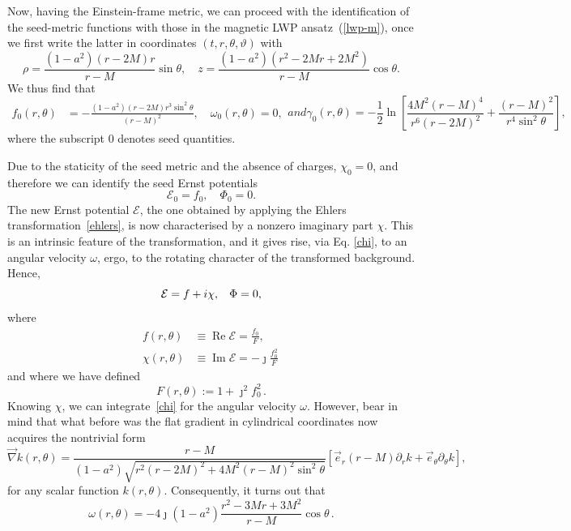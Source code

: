 \documentclass[aps,preprint,groupedaddress,nofootinbib,superscriptaddress,showkeys,showpacs,eqsecnum,amsmath,amssymb]{revtex4-1}
\newcommand{\ernst}{\mathcal{E}}
\renewcommand\Re{\operatorname{Re}}
\renewcommand\Im{\operatorname{Im}}
\begin{document}
Now, having the Einstein-frame metric, we can proceed with the identification of the seed-metric functions with those in the magnetic LWP ansatz~(\ref{lwp-m}), once we first write the latter in coordinates $(t,r,\theta,\vartheta)$ with 
\begin{equation}
    \rho = \frac{(1-a^2)(r-2M)r}{r-M}\sin\theta,\quad z=\frac{(1-a^2)(r^2-2M r + 2M^2)}{r-M}\cos\theta.
\end{equation}
We thus find that
\begin{subequations}\label{seedmetricLWP}
\begin{align}
f_0(r,\theta) &= -\frac{(1-a^2)(r-2M)r^3\sin^2\theta}{(r-M)^2}, \quad
\omega_0(r,\theta) = 0,
\end{align} 
and 
\begin{equation}
    \gamma_0(r,\theta)=-\frac{1}{2}\ln\left[ \frac{4M^2(r-M)^4}{r^6(r-2M)^2} + \frac{(r-M)^2}{r^4\sin^2\theta} \right],
\end{equation}
\end{subequations}
where the subscript $0$ denotes seed quantities. 


Due to the staticity of the seed metric and the absence of charges, $\chi_0=0$, and therefore we can identify 
the seed Ernst potentials
\begin{equation}
\ernst_0=f_0, \quad \Phi_0=0.
\end{equation}
The new Ernst potential $\ernst$, the one obtained by applying the Ehlers transformation~\eqref{ehlers}, is now characterised by a nonzero imaginary part $\chi$. This is an intrinsic feature of the transformation, and it gives rise, via Eq. \eqref{chi}, to an angular velocity $\omega$, ergo, to the rotating character of the transformed background. 
Hence, 
\begin{equation}
\ernst=f+i\chi, \hspace{0.3cm} \Phi=0,
\end{equation}
where 
\begin{subequations}
\begin{align}
f(r,\theta) &\equiv \Re \ernst= \frac{f_0}{F}, \\
\chi(r,\theta) &\equiv \Im\ernst= -\jmath \frac{f_0^2}{F} \, 
\end{align}
\end{subequations}
and where we have defined 
\begin{equation}
F(r,\theta) := 1 + \jmath^2 f_0^2 \,.
\end{equation}
Knowing $\chi$, we can integrate~\eqref{chi} for the angular velocity $\omega$. However, bear in mind that what before was the flat gradient in cylindrical coordinates now acquires the nontrivial form
\begin{equation}
    \vec{\nabla} k(r,\theta) = \frac{r-M}{(1-a^2)\sqrt{r^2(r-2M)^2 + 4M^2(r-M)^2\sin^2\theta}}\left[\vec{e}_r(r-M)\partial_r k + \vec{e}_\theta\partial_\theta k\right],
\end{equation}
for any scalar function $k(r,\theta)$. Consequently, it turns out that
\begin{equation}
\omega(r,\theta) = -4\jmath (1-a^2) \frac{r^2-3Mr+3M^2}{r-M} \cos\theta \,.\label{eq:omega}
\end{equation}
\end{document}

